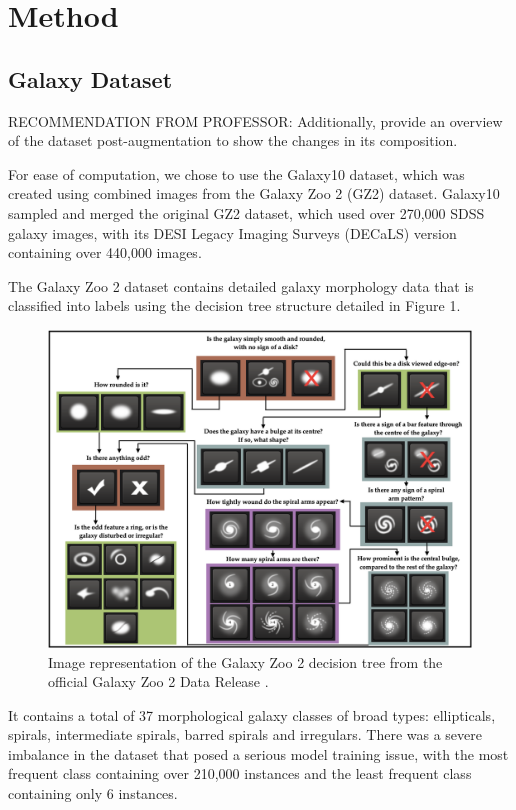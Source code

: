 \documentclass[10pt,twocolumn,letterpaper]{article}
\begin{document}
\section{Method}
\subsection{Galaxy Dataset}
RECOMMENDATION FROM PROFESSOR:
Additionally, provide an overview of the dataset post-augmentation to show the changes in its composition.

For ease of computation, we chose to use the Galaxy10 dataset, which was created using combined images from the Galaxy Zoo 2 (GZ2) dataset.
Galaxy10 sampled and merged the original GZ2 dataset, which used over 270,000 SDSS galaxy images, with its DESI Legacy Imaging Surveys (DECaLS) version containing over 440,000 images.

The Galaxy Zoo 2 dataset contains detailed galaxy morphology data that is classified into labels using the decision tree structure detailed in Figure 1.
\begin{figure}[htbp]
    \includegraphics[width=\linewidth]{decision_tree.png}
    \caption{Image representation of the Galaxy Zoo 2 decision tree from the official Galaxy Zoo 2 Data Release \cite{Willett13}.}
    \label{fig:decisiontree}
  \end{figure}

\noindent It contains a total of 37 morphological galaxy classes of broad types: ellipticals, spirals, intermediate spirals, barred spirals and irregulars.
There was a severe imbalance in the dataset that posed a serious model training issue, with the most frequent class containing over 210,000 instances and the least frequent class containing only 6 instances.
\end{document}
